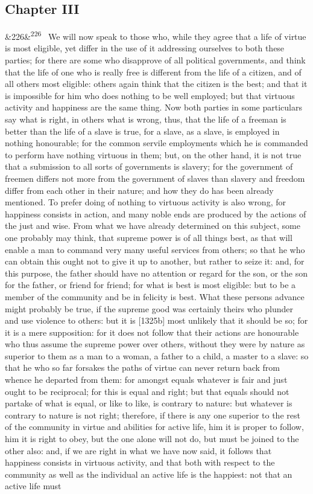 \documentclass[12pt]{article}
\newcommand{\para}[1][]{\par\noindent\ifx&#1&\else\textsuperscript{\footnotesize #1}~\fi}
\begin{document}
\subsection*{Chapter III}

\para[226] We will now speak to those who, while they agree that a life of virtue is most eligible, yet differ in the use of it addressing ourselves to both these parties; for there are some who disapprove of all political governments, and think that the life of one who is really free is different from the life of a citizen, and of all others most eligible: others again think that the citizen is the best; and that it is impossible for him who does nothing to be well employed; but that virtuous activity and happiness are the same thing. Now both parties in some particulars say what is right, in others what is wrong, thus, that the life of a freeman is better than the life of a slave is true, for a slave, as a slave, is employed in nothing honourable; for the common servile employments which he is commanded to perform have nothing virtuous in them; but, on the other hand, it is not true that a submission to all sorts of governments is slavery; for the government of freemen differs not more from the government of slaves than slavery and freedom differ from each other in their nature; and how they do has been already mentioned. To prefer doing of nothing to virtuous activity is also wrong, for happiness consists in action, and many noble ends are produced by the actions of the just and wise. From what we have already determined on this subject, some one probably may think, that supreme power is of all things best, as that will enable a man to command very many useful services from others; so that he who can obtain this ought not to give it up to another, but rather to seize it: and, for this purpose, the father should have no attention or regard for the son, or the son for the father, or friend for friend; for what is best is most eligible: but to be a member of the community and be in felicity is best. What these persons advance might probably be true, if the supreme good was certainly theirs who plunder and use violence to others: but it is [1325b] most unlikely that it should be so; for it is a mere supposition: for it does not follow that their actions are honourable who thus assume the supreme power over others, without they were by nature as superior to them as a man to a woman, a father to a child, a master to a slave: so that he who so far forsakes the paths of virtue can never return back from whence he departed from them: for amongst equals whatever is fair and just ought to be reciprocal; for this is equal and right; but that equals should not partake of what is equal, or like to like, is contrary to nature: but whatever is contrary to nature is not right; therefore, if there is any one superior to the rest of the community in virtue and abilities for active life, him it is proper to follow, him it is right to obey, but the one alone will not do, but must be joined to the other also: and, if we are right in what we have now said, it follows that happiness consists in virtuous activity, and that both with respect to the community as well as the individual an active life is the happiest: not that an active life must 
\end{document}
